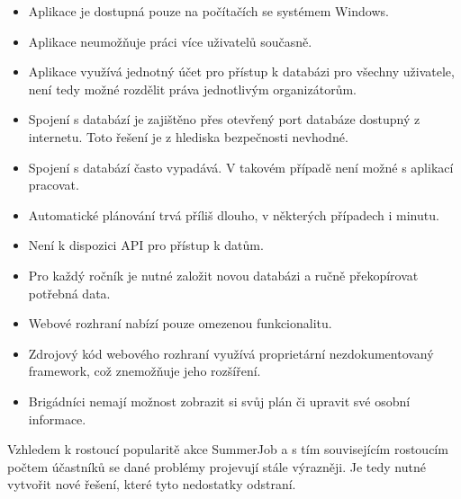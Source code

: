\begin{itemize}
    \item Aplikace je dostupná pouze na počítačích se systémem Windows.
    \item Aplikace neumožňuje práci více uživatelů současně.
    \item Aplikace využívá jednotný účet pro přístup k databázi pro všechny uživatele, není tedy možné rozdělit práva jednotlivým organizátorům.
    \item Spojení s databází je zajištěno přes otevřený port databáze dostupný z internetu. Toto řešení je z hlediska bezpečnosti nevhodné.
    \item Spojení s databází často vypadává. V takovém případě není možné s aplikací pracovat.
    \item Automatické plánování trvá příliš dlouho, v některých případech i minutu.
    \item Není k dispozici API pro přístup k datům.
    \item Pro každý ročník je nutné založit novou databázi a ručně překopírovat potřebná data.
    \item Webové rozhraní nabízí pouze omezenou funkcionalitu.
    \item Zdrojový kód webového rozhraní využívá proprietární nezdokumentovaný framework, což znemožňuje jeho rozšíření.
    \item Brigádníci nemají možnost zobrazit si svůj plán či upravit své osobní informace.
\end{itemize}

Vzhledem k rostoucí popularitě akce SummerJob a s tím souvisejícím rostoucím počtem účastníků se dané problémy projevují stále výrazněji.
Je tedy nutné vytvořit nové řešení, které tyto nedostatky odstraní.
